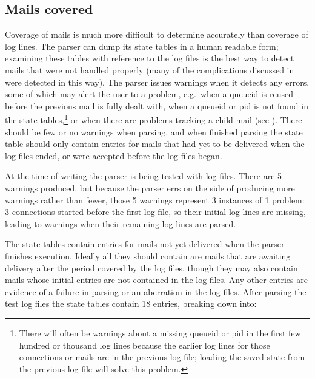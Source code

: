 \subsection{Mails covered}

\label{mails-covered}

Coverage of mails is much more difficult to determine accurately than
coverage of log lines.  The parser can dump its state tables in a human
readable form; examining these tables with reference to the log files is
the best way to detect mails that were not handled properly (many of the
complications discussed in  were
detected in this way).  The parser issues warnings when it detects any
errors, some of which may alert the user to a problem, e.g.\ when a queueid
is reused before the previous mail is fully dealt with, when a queueid or
\gls{pid} is not found in the state tables,\footnote{There will often be
warnings about a missing queueid or \gls{pid} in the first few hundred or
thousand log lines because the earlier log lines for those connections or
mails are in the previous log file; loading the saved state from the
previous log file will solve this problem.} or when there are problems
tracking a child mail (see ).  There
should be few or no warnings when parsing, and when finished parsing the
state table should only contain entries for mails that had yet to be
delivered when the log files ended, or were accepted before the log files
began.

At the time of writing the parser is being tested with \numberOFlogFILES{}
log files.  There are 5 warnings produced, but because the parser errs on
the side of producing more warnings rather than fewer, those 5 warnings
represent 3 instances of 1 problem: 3 connections started before the first
log file, so their initial log lines are missing, leading to warnings when
their remaining log lines are parsed.

The state tables contain entries for mails not yet delivered when the
parser finishes execution.  Ideally all they should contain are mails that
are awaiting delivery after the period covered by the log files, though
they may also contain mails whose initial entries are not contained in the
log files.  Any other entries are evidence of a failure in parsing or an
aberration in the log files.  After parsing the \numberOFlogFILES{} test
log files the state tables contain 18 entries, breaking down into:

